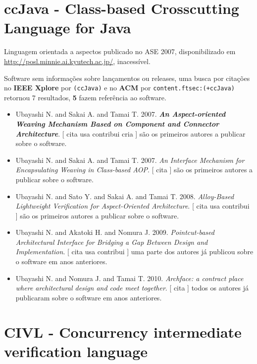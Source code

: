 \section{ccJava - Class-based Crosscutting Language for Java}

Linguagem orientada a aspectos
publicado no ASE 2007,
disponibilizado em \url{http://posl.minnie.ai.kyutech.ac.jp/},
inacessível.

Software sem informações sobre lançamentos ou releases,
uma busca por citações no {\bf IEEE Xplore} por
\texttt{(ccJava)}
e no {\bf ACM} por
\texttt{content.ftsec:(+ccJava)}
retornou
7 resultados,
{\bf 5} fazem referência ao software.

\begin{itemize}
\item Ubayashi N. and Sakai A. and Tamai T.
      2007.
        \textbf{\textit{ An Aspect-oriented Weaving Mechanism Based on Component and Connector Architecture}}.
      [
          cita
          usa
          contribui
          cria
      ]
são os primeiros autores a publicar sobre o software.
\item Ubayashi N. and Sakai A. and Tamai T.
      2007.
        \textit{ An Interface Mechanism for Encapsulating Weaving in Class-based AOP}.
      [
          cita
      ]
são os primeiros autores a publicar sobre o software.
\item Ubayashi N. and Sato Y. and Sakai A. and Tamai T.
      2008.
        \textit{ Alloy-Based Lightweight Verification for Aspect-Oriented Architecture}.
      [
          cita
          usa
          contribui
      ]
são os primeiros autores a publicar sobre o software.
\item Ubayashi N. and Akatoki H. and Nomura J.
      2009.
        \textit{ Pointcut-based Architectural Interface for Bridging a Gap Between Design and Implementation}.
      [
          cita
          usa
          contribui
      ]
uma parte dos autores já publicou sobre o software em anos anteriores.
\item Ubayashi N. and Nomura J. and Tamai T.
      2010.
        \textit{ Archface: a contract place where architectural design and code meet together}.
      [
          cita
      ]
todos os autores já publicaram sobre o software em anos anteriores.
\end{itemize}
\section{CIVL - Concurrency intermediate verification language}

